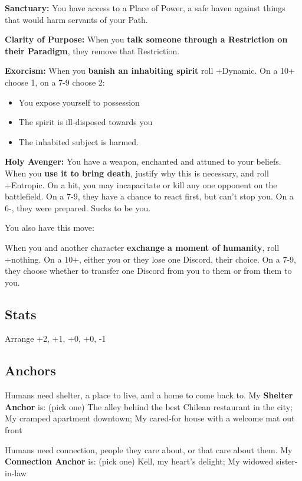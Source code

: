 \documentclass[
  oneside,
  statementpaper,
  9pt]{memoir}
\begin{document}
\textbf{Sanctuary:} You have access to a Place of Power, a safe haven
against things that would harm servants of your Path.

\textbf{Clarity of Purpose:} When you \textbf{talk someone through a
Restriction on their Paradigm}, they remove that Restriction.

\textbf{Exorcism:} When you \textbf{banish an inhabiting spirit} roll
+Dynamic. On a 10+ choose 1, on a 7-9 choose 2:

\begin{itemize}
\tightlist
\item
  You expose yourself to possession
\item
  The spirit is ill-disposed towards you
\item
  The inhabited subject is harmed.
\end{itemize}

\textbf{Holy Avenger:} You have a weapon, enchanted and attuned to your
beliefs. When you \textbf{use it to bring death}, justify why this is
necessary, and roll +Entropic. On a hit, you may incapacitate or kill
any one opponent on the battlefield. On a 7-9, they have a chance to
react first, but can't stop you. On a 6-, they were prepared. Sucks to
be you.

You also have this move:

When you and another character \textbf{exchange a moment of humanity},
roll +nothing. On a 10+, either you or they lose one Discord, their
choice. On a 7-9, they choose whether to transfer one Discord from you
to them or from them to you.

\hypertarget{stats-6}{%
\subsection{Stats}\label{stats-6}}

Arrange +2, +1, +0, +0, -1

\hypertarget{anchors-6}{%
\subsection{Anchors}\label{anchors-6}}

Humans need shelter, a place to live, and a home to come back to. My
\textbf{Shelter Anchor} is: (pick one) The alley behind the best Chilean
restaurant in the city; My cramped apartment downtown; My cared-for
house with a welcome mat out front

Humans need connection, people they care about, or that care about them.
My \textbf{Connection Anchor} is: (pick one) Kell, my heart's delight;
My widowed sister-in-law
\end{document}
